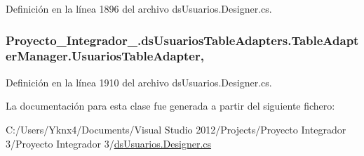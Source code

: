 Definición en la línea 1896 del archivo ds\-Usuarios.\-Designer.\-cs.

\hypertarget{class_proyecto___integrador__3_1_1ds_usuarios_table_adapters_1_1_table_adapter_manager_a6f705d0845d567f189bcf19a2c8138fe}{
\subsubsection[{Usuarios\-Table\-Adapter}]{ Proyecto\-\_\-\-Integrador\-\_.\-ds\-Usuarios\-Table\-Adapters.\-Table\-Adapter\-Manager.\-Usuarios\-Table\-Adapter\hspace{0.3cm}{\ttfamily [get]}, {\ttfamily [set]}}}\label{class_proyecto___integrador__3_1_1ds_usuarios_table_adapters_1_1_table_adapter_manager_a6f705d0845d567f189bcf19a2c8138fe}


Definición en la línea 1910 del archivo ds\-Usuarios.\-Designer.\-cs.



La documentación para esta clase fue generada a partir del siguiente fichero\-:\begin{DoxyCompactItemize}
\item 
C\-:/\-Users/\-Yknx4/\-Documents/\-Visual Studio 2012/\-Projects/\-Proyecto Integrador 3/\-Proyecto Integrador 3/\hyperlink{ds_usuarios_8_designer_8cs}{ds\-Usuarios.\-Designer.\-cs}\end{DoxyCompactItemize}
